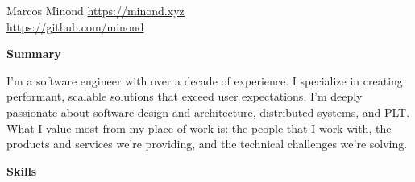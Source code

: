 \documentclass[10pt]{article}
\newcommand{\SectionTitle}[2][.2in] {
  \vspace{#1}
  \textbf{\large #2}
  \vspace{.1in}
}
\begin{document}
\begin{flushleft}

\huge{Marcos Minond} \normalsize
\hfill \href{https://minond.xyz}{https://minond.xyz} \\
\hfill \href{https://github.com/minond}{https://github.com/minond}

\normalsize


\SectionTitle[.025in]{Summary}

I'm a software engineer with over a decade of experience. I specialize in
creating performant, scalable solutions that exceed user expectations. I'm
deeply passionate about software design and architecture, distributed
systems, and PLT. What I value most from my place of work is: the people that
I work with, the products and services we're providing, and the technical
challenges we're solving.




%

\SectionTitle{Skills}



\end{flushleft}
\end{document}
